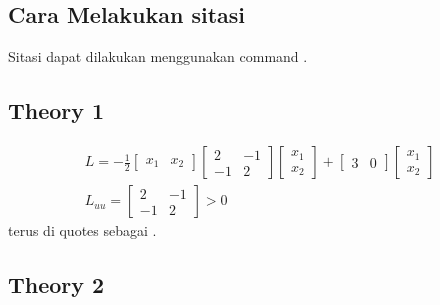 \subsection{Cara Melakukan sitasi}{
    Sitasi dapat dilakukan menggunakan command \cite{han_heo_park_kee_sunwoo_2016}.
    \lipsum[2]
}

\subsection{Theory 1}
    \lipsum[6]
    \begin{equation}
        \begin{array}{l}
        L=-\frac{1}{2}\left[\begin{array}{ll}
        x_{1} & x_{2}
        \end{array}\right]\left[\begin{array}{ll}
        2 & -1 \\
        -1 & 2
        \end{array}\right]\left[\begin{array}{l}
        x_{1} \\
        x_{2}
        \end{array}\right]+\left[\begin{array}{ll}
        3 & 0
        \end{array}\right]\left[\begin{array}{l}
        x_{1} \\
        x_{2}
        \end{array}\right] \\
        L_{u u}=\left[\begin{array}{ll}
        2 & -1 \\
        -1 & 2
        \end{array}\right]>0
        \end{array}
        \label{eq: test}
    \end{equation}
    terus di quotes sebagai .
    \lipsum[7-8]

\subsection{Theory 2}{
    \lipsum[6-8]
}